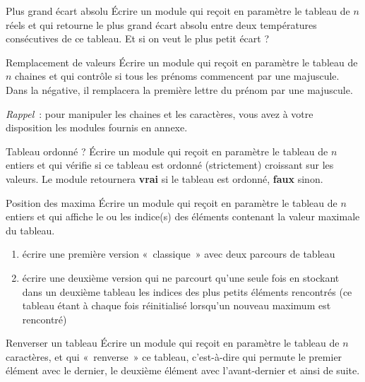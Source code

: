 \begin{Exercice}{Plus grand écart absolu}
	Écrire un module qui reçoit en paramètre le tableau
	 de $n$ réels et qui
	retourne le plus grand écart absolu entre deux températures 
	consécutives de ce tableau.
	Et si on veut le plus petit écart ?
\end{Exercice}

\begin{Exercice}{Remplacement de valeurs}
	Écrire un module qui reçoit en paramètre le tableau
	 de $n$ chaines et qui
	contrôle si tous les prénoms commencent par une majuscule.
	Dans la négative, il remplacera la première lettre du prénom 
	par une majuscule.
	
	\textit{Rappel}~: pour manipuler les chaines et les caractères,
	vous avez à votre disposition les modules fournis en annexe.
\end{Exercice}

\begin{Exercice}{Tableau ordonné ?}
	Écrire un module qui reçoit en paramètre le tableau
	 de $n$ entiers et qui
	vérifie si ce tableau est ordonné (strictement) croissant sur les
	valeurs. Le module retournera \textbf{vrai} si le tableau est ordonné,
	\textbf{faux} sinon.
\end{Exercice}

\begin{Exercice}{Position des maxima}
	Écrire un module qui reçoit en paramètre le tableau
	 de $n$ entiers et qui
	affiche le ou les indice(s) des éléments contenant la valeur maximale
	du tableau.

	\begin{enumerate}[label=\alph*)]
	\item 
		écrire une première version «~classique~» avec deux parcours de tableau
	\item
		écrire une deuxième version qui ne parcourt qu’une seule fois 
		 en
		stockant dans un deuxième tableau les indices des plus petits éléments
		rencontrés (ce tableau étant à chaque fois réinitialisé lorsqu’un
		nouveau maximum est rencontré)
	\end{enumerate}
\end{Exercice}

\begin{Exercice}{Renverser un tableau}
	Écrire un module qui reçoit en paramètre le tableau
	 de $n$ caractères, et qui
	«~renverse~» ce tableau, c’est-à-dire qui permute le premier élément
	avec le dernier, le deuxième élément avec l’avant-dernier et ainsi de
	suite.
\end{Exercice}

